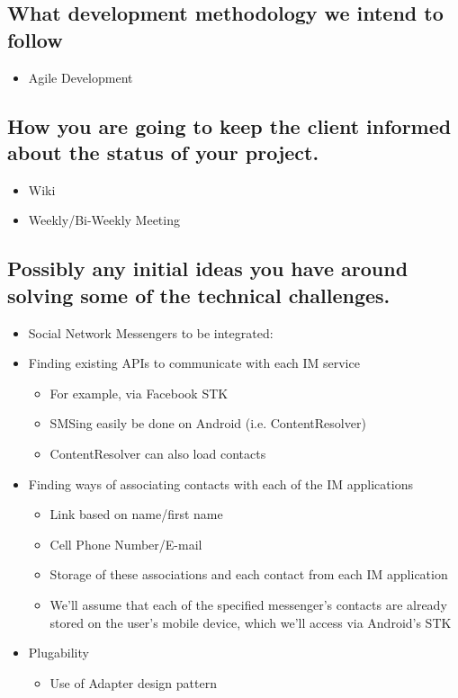 
\subsection{What development methodology we intend to follow}
\begin{itemize}
    \item Agile Development
\end{itemize}
\subsection{How you are going to keep the client informed about the status of your project.}
\begin{itemize}
    \item Wiki
    \item Weekly/Bi-Weekly Meeting
\end{itemize}
\subsection{Possibly any initial ideas you have around solving some of the technical challenges.}
\begin{itemize}
    \item Social Network Messengers to be integrated:
    \item Finding existing APIs to communicate with each IM service 
        \begin{itemize}
            \item For example, via Facebook STK
            \item SMSing easily be done on Android (i.e. ContentResolver)
            \item ContentResolver can also load contacts
        \end{itemize}
    \item Finding ways of associating contacts with each of the IM applications
        \begin{itemize}
            \item Link based on name/first name
            \item Cell Phone Number/E-mail
            \item Storage of these associations and each contact from each IM application
            \item We'll assume that each of the specified messenger's contacts are already stored on the user's mobile device, which we'll access via Android's STK
        \end{itemize}
    \item Plugability
        \begin{itemize}
            \item Use of Adapter design pattern
        \end{itemize}
\end{itemize}
